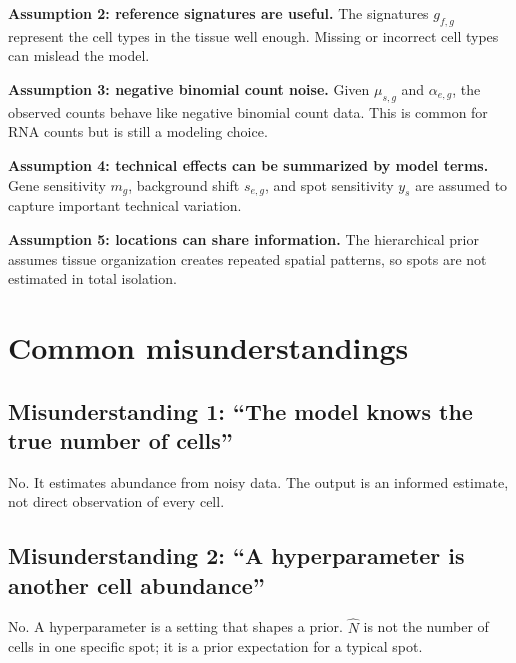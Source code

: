 \documentclass[11pt]{article}
\newcommand{\term}[1]{\textbf{#1}}
\begin{document}
\begin{assumptionbox}
\term{Assumption 2: reference signatures are useful.} The signatures $g_{f,g}$ represent the cell types in the tissue well enough. Missing or incorrect cell types can mislead the model.
\end{assumptionbox}

\begin{assumptionbox}
\term{Assumption 3: negative binomial count noise.} Given $\mu_{s,g}$ and $\alpha_{e,g}$, the observed counts behave like negative binomial count data. This is common for RNA counts but is still a modeling choice.
\end{assumptionbox}

\begin{assumptionbox}
\term{Assumption 4: technical effects can be summarized by model terms.} Gene sensitivity $m_g$, background shift $s_{e,g}$, and spot sensitivity $y_s$ are assumed to capture important technical variation.
\end{assumptionbox}

\begin{assumptionbox}
\term{Assumption 5: locations can share information.} The hierarchical prior assumes tissue organization creates repeated spatial patterns, so spots are not estimated in total isolation.
\end{assumptionbox}

\section{Common misunderstandings}

\subsection{Misunderstanding 1: ``The model knows the true number of cells''}

No. It estimates abundance from noisy data. The output is an informed estimate, not direct observation of every cell.

\subsection{Misunderstanding 2: ``A hyperparameter is another cell abundance''}

No. A hyperparameter is a setting that shapes a prior. $\hat N$ is not the number of cells in one specific spot; it is a prior expectation for a typical spot.
\end{document}
